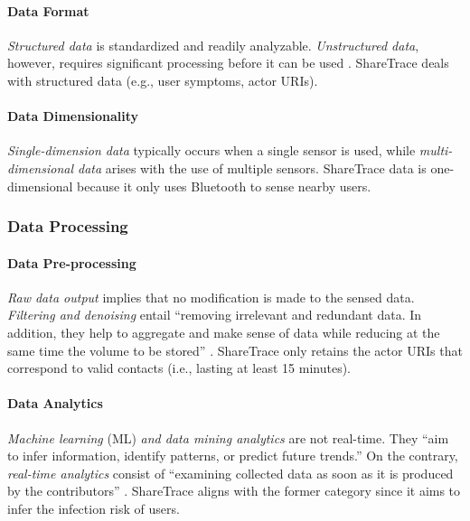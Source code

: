 \paragraph{Data Format}

\emph{Structured data} is standardized and readily analyzable. \emph{Unstructured data}, however, requires significant processing before it can be used \cite{Capponi2019}. ShareTrace deals with structured data (e.g., user symptoms, actor URIs).

\paragraph{Data Dimensionality}

\emph{Single-dimension data} typically occurs when a single sensor is used, while \emph{multi-dimensional data} arises with the use of multiple sensors. ShareTrace data is one-dimensional because it only uses Bluetooth to sense nearby users.

\subsubsection{Data Processing}

\paragraph{Data Pre-processing}

\emph{Raw data output} implies that no modification is made to the sensed data. \emph{Filtering and denoising} entail ``removing irrelevant and redundant data. In addition, they help to aggregate and make sense of data while reducing at the same time the volume to be stored'' \cite{Capponi2019}. ShareTrace only retains the actor URIs that correspond to valid contacts (i.e., lasting at least 15 minutes).

\paragraph{Data Analytics}

\emph{Machine learning} (ML) \emph{and data mining analytics} are not real-time. They ``aim to infer information, identify patterns, or predict future trends.'' On the contrary, \emph{real-time analytics} consist of ``examining collected data as soon as it is produced by the contributors'' \cite{Capponi2019}. ShareTrace aligns with the former category since it aims to infer the infection risk of users.

